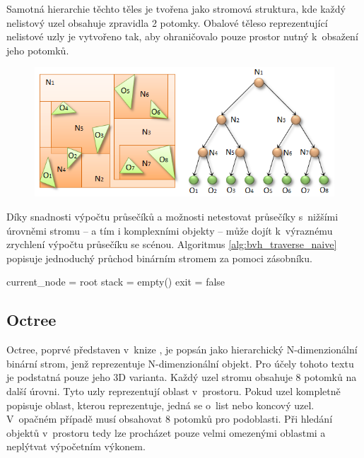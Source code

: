 Samotná hierarchie těchto těles je tvořena jako stromová struktura, kde každý nelistový uzel obsahuje zpravidla 2 potomky. Obalové těleso reprezentující nelistové uzly je vytvořeno tak, aby ohraničovalo pouze prostor nutný k~obsažení jeho potomků.

\begin{figure}[H]
	\centering
	\includegraphics[scale=0.5]{images/fig03-bvh.png}
	\captionsetup{justification=centering}
	\label{fig:slabs}
\end{figure}

Díky snadnosti výpočtu průsečíků a možnosti netestovat průsečíky s~nižšími úrovněmi stromu -- a tím i komplexními objekty -- může dojít k~výraznému zrychlení výpočtu průsečíku se scénou. Algoritmus \ref{alg:bvh_traverse_naive} popisuje jednoduchý průchod binárním stromem za pomoci zásobníku.

\begin{center}
	\begin{czechalgorithm}[H] \label{alg:bvh_traverse_naive}
		current\_node = root\;
		stack = empty()\;
		exit = false\;
		 {
		}
		\caption{Průchod BVH stromem pro ray tracing \cite{Vaidyanathan2019WideBT}}
	\end{czechalgorithm}
\end{center}



\subsection{Octree} \label{octree}
Octree, poprvé představen v~knize \cite{rensselaer1980octree}, je popsán jako hierarchický N-dimenzionální binární strom, jenž reprezentuje N-dimenzionální objekt. Pro účely tohoto textu je podstatná pouze jeho 3D varianta. Každý uzel stromu obsahuje 8 potomků na další úrovni. Tyto uzly reprezentují oblast v~prostoru. Pokud uzel kompletně popisuje oblast, kterou reprezentuje, jedná se o~list nebo koncový uzel. V~opačném případě musí obsahovat 8 potomků pro podoblasti. Při hledání objektů v~prostoru tedy lze procházet pouze velmi omezenými oblastmi a neplýtvat výpočetním výkonem.

